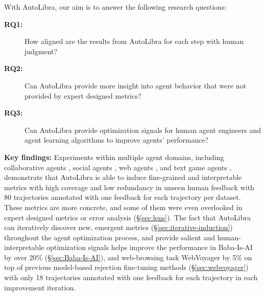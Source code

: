 With AutoLibra, our aim is to answer the following research questions:

\begin{description}
    \item[\textbf{RQ1:}] How aligned are the results from AutoLibra for each step with human judgment?
    \item[\textbf{RQ2:}] Can AutoLibra provide more insight into agent behavior that were not provided by expert designed metrics?
    \item[\textbf{RQ3:}] Can AutoLibra provide optimization signals for human agent engineers and agent learning algorithms to improve agents' performance?
\end{description}

\textbf{Key findings:}
Experiments within multiple agent domains, including collaborative agents \citep{shao2024collaborative}, social agents
\citep{zhousotopia}, web agents \citep{zhouwebarena,he2024webvoyager}, and text game agents \citep{paglieri2024balrog,cloos2024babaaibreakrules}, 
demonstrate that AutoLibra is able to induce fine-grained and interpretable metrics with high coverage and low redundancy in unseen human feedback with 80 trajectories annotated with one feedback for each trajectory per dataset. These metrics are more concrete, and some of them were even overlooked in expert designed metrics or error analysis (\S\ref{sec:lens}). The fact that AutoLibra can iteratively discover new, emergent metrics (\S\ref{sec:iterative-induction}) throughout the agent optimization process,
and provide salient and human-interpretable optimization signals helps improve the performance in Baba-Is-AI by over 20\% (\S\ref{sec:Baba-Is-AI}), and web-browsing task WebVoyager by 5\% on top of previous model-based rejection fine-tuning methods (\S\ref{sec:webvoyager}) with only 18 trajectories annotated with one feedback for each trajectory in each improvement iteration. 



